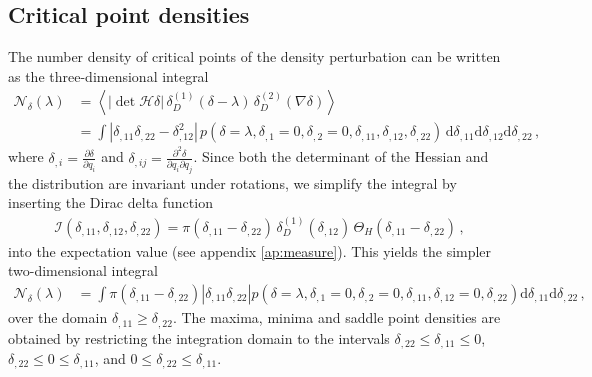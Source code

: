 \documentclass[a4paper, 11pt]{article}
\begin{document}
\subsection{Critical point densities}
The number density of critical points of the density perturbation can be written as the three-dimensional integral
\begin{align}
\mathcal{N}_{\delta}(\lambda) 
&= \left \langle 
|\det \mathcal{H} \delta |\, \delta_D^{(1)}(\delta - \lambda)\, \delta_D^{(2)}(\nabla \delta)
\right \rangle\nonumber\\
&=\int |\delta_{,11}\delta_{,22}-\delta_{,12}^2|\, p(\delta = \lambda, \delta_{,1}=0, \delta_{,2}=0, \delta_{,11},\delta_{,12},\delta_{,22})\,
\mathrm{d}\delta_{,11}\mathrm{d}\delta_{,12}\mathrm{d}\delta_{,22}\,,
\end{align}
where $\delta_{,i} = \frac{\partial \delta}{\partial q_i}$ and $\delta_{,ij} = \frac{\partial^2 \delta}{\partial q_i \partial q_j}$. Since both the determinant of the Hessian and the distribution are invariant under rotations, we simplify the integral by inserting the Dirac delta function 
\begin{align}
\mathcal{I}(\delta_{,11},\delta_{,12},\delta_{,22})=\pi (\delta_{,11} - \delta_{,22})\,\delta_D^{(1)}(\delta_{,12})\,\Theta_H(\delta_{,11}-\delta_{,22})\,,
\end{align}
into the expectation value (see appendix \ref{ap:measure}). This yields the simpler two-dimensional integral 
\begin{align}
\mathcal{N}_{\delta}(\lambda) 
&= \int \pi (\delta_{,11} - \delta_{,22})|\delta_{,11}\delta_{,22}| p(\delta = \lambda, \delta_{,1}=0, \delta_{,2}=0, \delta_{,11},\delta_{,12}=0,\delta_{,22})
\mathrm{d}\delta_{,11}\mathrm{d}\delta_{,22}\,,
\end{align}
over the domain $\delta_{,11}\geq \delta_{,22}$.
The maxima, minima and saddle point densities are obtained by restricting the integration domain to the intervals $\delta_{,22} \leq \delta_{,11} \leq 0$, $\delta_{,22} \leq 0 \leq \delta_{,11}$, and $ 0  \leq \delta_{,22} \leq \delta_{,11}$.
\end{document}

